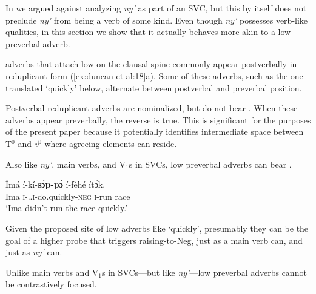 \documentclass[output=paper,modfonts,nonflat,
colorlinks, citecolor=brown,
]{langsci/langscibook}
\begin{document}
In  we argued against analyzing \textit{ny\'{\textturnv}\ng} as part of an SVC, but this by itself does not preclude \textit{ny\'{\textturnv}\ng} from being a verb of some kind. Even though \textit{ny\'{\textturnv}\ng} possesses verb-like qualities, in this section we show that it actually behaves more akin to a low preverbal adverb.

 adverbs that attach low on the clausal spine commonly appear postverbally in reduplicant form (\ref{ex:duncan-et-al:18}a). Some of these adverbs, such as the one translated `quickly' below, alternate between postverbal and preverbal position.

\ea\label{ex:duncan-et-al:18}
\z
\z

\noindent Postverbal reduplicant adverbs are nominalized, but do not bear . When these adverbs appear preverbally, the reverse is true. This is significant for the purposes of the present paper because it potentially identifies intermediate space between T$^0$ and \textit{v}$^0$ where  agreeing elements can reside.

Also like \textit{ny\'{\textturnv}\ng}, main verbs, and V$_1$s in SVCs, low preverbal adverbs can bear .

\ea\label{ex:duncan-et-al:19}
\gll \'{I}má í-kí-\textbf{s\'ɔp-p\'ɔ} í-f\`{e}hé ít\`ɔk. \\
Ima \textsc{i}-{\PST.\FOC}.\textsc{i}-do.quickly-\textsc{neg} \textsc{i}-run race \\
\glt `Ima didn't run the race quickly.'
\z

\noindent Given the proposed site of low adverbs like `quickly', presumably they can be the goal of a higher probe that triggers raising-to-Neg, just as a main verb can, and just as \textit{ny\'{\textturnv}\ng} can. 

Unlike main verbs and V$_1$s in SVCs---but like \textit{ny\'{\textturnv}\ng}---low preverbal adverbs cannot be contrastively focused.
\end{document}
